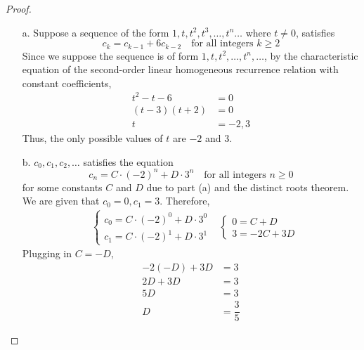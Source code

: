 \begin{proof}
    \begin{enumerate}
        \item[a.] 
            Suppose a sequence of the form $1,t,t^2,t^3, \ldots, t^n \ldots$ where $t \neq 0$, satisfies 
            \begin{equation*}
                c_k = c_{k-1} + 6c_{k-2} \quad \text{for all integers $k \geq 2$}
            \end{equation*}
            Since we suppose the sequence is of form $1, t, t^2, \ldots, t^n, \ldots$, by the characteristic equation of the second-order linear homogeneous recurrence relation with constant coefficients, 
            \begin{align*}
                t^2 - t - 6 &= 0 \\
                (t - 3)(t + 2) &= 0 \\
                t &= -2, 3
            \end{align*}
            Thus, the only possible values of $t$ are $-2$ and $3$.
        \item[b.] 
            $c_0, c_1, c_2, \ldots$ satisfies the equation
            \begin{equation*}
                c_n = C\cdot (-2)^n + D\cdot 3^n \quad \text{for all integers $n \geq 0$}
            \end{equation*}
            for some constants $C$ and $D$ due to part (a) and the distinct roots theorem. We are given that $c_0 = 0, c_1 = 3$. Therefore, 
            \begin{align*}
                &\begin{cases} 
                    c_0 = C\cdot (-2)^0 + D\cdot 3^0 \\
                    c_1 = C\cdot (-2)^1 + D\cdot 3^1
                \end{cases}
                &\begin{cases} 
                    0 = C + D \\
                    3 = -2C + 3D
                \end{cases}
            \end{align*}
            Plugging in $C = - D$, 
            \begin{align*}
                -2(-D) + 3D &= 3 \\
                2D + 3D &= 3 \\
                5D &= 3 \\
                D &= \dfrac{3}{5}
            \end{align*}

\end{enumerate}
\end{proof}
